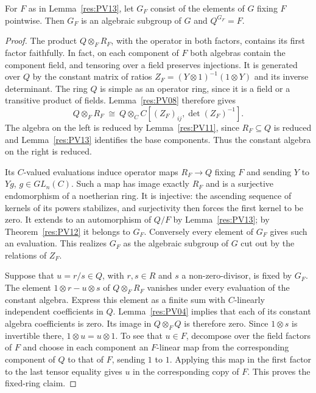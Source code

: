 \begin{theorem}
\label{res:PV14}
For \(F\) as in Lemma~\ref{res:PV13}, let \(G_F\) consist of the
elements of \(G\) fixing \(F\) pointwise. Then \(G_F\) is an
algebraic subgroup of \(G\) and \(Q^{G_F}=F\).
\end{theorem}

\begin{proof}
The product \(Q\otimes_F R_F\), with the operator in both
factors, contains its first factor faithfully. In fact, on
each component of \(F\) both algebras contain the component
field, and tensoring over a field preserves injections.
It is generated over \(Q\) by the constant matrix of ratios
\(Z_F=(Y\otimes1)^{-1}(1\otimes Y)\) and its inverse determinant.
The ring \(Q\) is simple as an operator ring, since it is a
field or a transitive product of fields. Lemma~\ref{res:PV08}
therefore gives
\[
 Q\otimes_F R_F \ \cong\
 Q\otimes_C C[(Z_F)_{ij},\det(Z_F)^{-1}].
\]
The algebra on the left is reduced by
Lemma~\ref{res:PV11}, since \(R_F\subseteq Q\) is reduced and
Lemma~\ref{res:PV13} identifies the base components. Thus
the constant algebra on the right is reduced.

Its \(C\)-valued evaluations induce operator maps \(R_F\to Q\)
fixing \(F\) and sending \(Y\) to \(Yg\), \(g\in GL_n(C)\).
Such a map has image exactly \(R_F\) and is a surjective
endomorphism of a noetherian ring. It is injective: the ascending
sequence of kernels of its powers stabilizes, and surjectivity
then forces the first kernel to be zero. It extends to an
automorphism of \(Q/F\) by Lemma~\ref{res:PV13}; by
Theorem~\ref{res:PV12} it belongs to \(G_F\). Conversely every
element of \(G_F\) gives such an evaluation. This realizes \(G_F\)
as the algebraic subgroup of \(G\) cut out by the relations of
\(Z_F\).

Suppose that \(u=r/s\in Q\), with \(r,s\in R\) and \(s\)
a non-zero-divisor, is fixed by \(G_F\). The element
\(1\otimes r-u\otimes s\) of \(Q\otimes_F R_F\) vanishes under
every evaluation of the constant algebra. Express this element
as a finite sum with \(C\)-linearly independent coefficients in
\(Q\). Lemma~\ref{res:PV04} implies that each of its constant
algebra coefficients is zero. Its image in \(Q\otimes_F Q\)
is therefore zero. Since \(1\otimes s\) is invertible there,
\(1\otimes u=u\otimes1\).
To see that \(u\in F\), decompose over the field factors of \(F\)
and choose in each component an \(F\)-linear map from the
corresponding component of \(Q\) to that of \(F\), sending \(1\)
to \(1\). Applying this map in the first factor to the last
tensor equality gives \(u\) in the corresponding copy of \(F\).
This proves the fixed-ring claim.
\end{proof}

